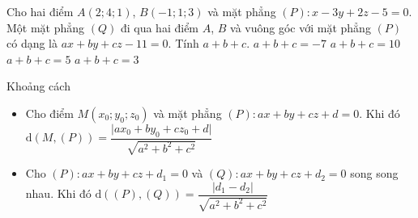\begin{ex}%
	Cho hai điểm $A(2;4;1)$, $B(-1;1;3)$ và mặt phẳng $(P)\colon x-3y+2z-5=0$. Một mặt phẳng $(Q)$ đi qua hai điểm $A$, $B$ và vuông góc với mặt phẳng $(P)$ có dạng là $ax+by+cz-11=0$. Tính $a+b+c$.
	\choice
	{$a+b+c=-7$}
	{$a+b+c=10$}
	{\True $a+b+c=5$}
	{$a+b+c=3$}
\end{ex}
\begin{dang}{Khoảng cách}
	\begin{itemize}
		\item [\iconCV]  Cho điểm $M(x_0;y_0;z_0)$ và mặt phẳng $(P) \colon ax+by+cz+d=0$. Khi đó
	$\mathrm{d}\left(M,(P) \right)=\dfrac{\bigg|ax_0+by_0+cz_0+d\bigg|}{\sqrt{a^2+b^2+c^2}}$
		\item [\iconCV]  	Cho $(P) \colon ax + by + cz + d_1=0$ và $(Q) \colon ax + by + cz + d_2=0$ song song nhau. 
		Khi đó
		$\mathrm{d}\left((P),(Q) \right)=\dfrac{\bigg|d_1-d_2\bigg|}{\sqrt{a^2+b^2+c^2}}$
	\end{itemize}
\end{dang}
\setcounter{ex}{0}
\setcounter{vd}{0}
